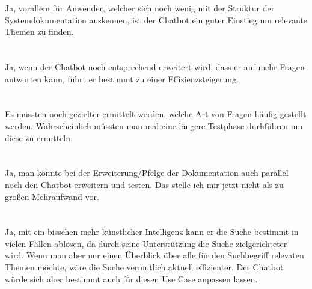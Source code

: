Ja, vorallem für Anwender, welcher sich noch wenig mit der Struktur der Systemdokumentation auskennen, ist der Chatbot ein guter Einstieg um relevante Themen zu finden. \\\\
\speaker{\frageAcht} \\
Ja, wenn der Chatbot noch entsprechend erweitert wird, dass er auf mehr Fragen antworten kann, führt er bestimmt zu einer Effizienzsteigerung. \\\\
\speaker{\frageNeun} \\
Es müssten noch gezielter ermittelt werden, welche Art von Fragen häufig gestellt werden. Wahrscheinlich müssten man mal eine längere Testphase durhführen um diese zu ermitteln. \\\\
\speaker{\frageZehn} \\
Ja, man könnte bei der Erweiterung/Pfelge der Dokumentation auch parallel noch den Chatbot erweitern und testen. Das stelle ich mir jetzt nicht als zu großen Mehraufwand vor. \\\\
\speaker{\frageElf} \\
Ja, mit ein bisschen mehr künstlicher Intelligenz kann er die Suche bestimmt in vielen Fällen ablösen, da durch seine Unterstützung die Suche zielgerichteter wird.  Wenn man aber nur einen Überblick über alle für den Suchbegriff relevaten Themen möchte, wäre die Suche vermutlich aktuell effizienter. Der Chatbot würde sich aber bestimmt auch für diesen Use Case anpassen lassen. 
\newpage

